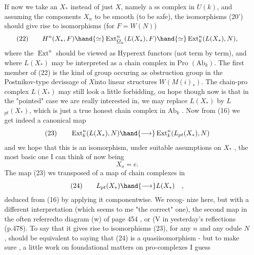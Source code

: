 If now we take an $X_*$ instead of just $X$, namely a ss complex in
$U(k)$, and assuming the components $X_n$ to be smooth (to be safe), the
isomorphisms (20') should give rise to isomorphisms (for $F=W(N)$)
\[ (22) \qquad H^n(X_*, F ) \hand{\simeq} \operatorname{Ext}^n_{\underline{O}_k}(L(X_*), F) \hand{\simeq} \operatorname{Ext}^n_k(L(X_*),N) , \]
where the $\operatorname{Ext}^n$ should be viewed as Hyperext functors (not term by
term), and where  $L(X_*)$ may be interpreted as a chain complex in
Pro $(\mathrm{Ab}_k)$. The first member of (22) is the kind of group occuring as
obstruction group in the Postnikov-type devissage of $X$\hand{$_*$}into linear
structures $W(M(i)_*)$. The chain-pro complex $L(X_*)$ may still look a
 little forbidding, ou hope though now is that in the "pointed" case
we are really interested in, we may replace $L(X_*)$ by $L$$_{pt}(X_*)$, which
is just a true honest chain complex in $\mathrm{Ab}_k$ . Now from (16) we get indeed
a canonical map
\[ (23) \qquad \operatorname{Ext}^n_k(L(X_*), N ) \hand{\longrightarrow} \operatorname{Ext}^n_k(L_{pt}(X_*), N ) \]
and we hope that this is an isomorphism, under suitable assumptions on
$X_*$ , the most basic one I can think of now being
\[ X_o = e . \]
The map (23) ws  transposed of a map of chain complexes in  
\[ (24) \qquad L_{pt}(X_*) \hand{\longrightarrow} L(X_*) \quad , \]
 deduced from (16) by applying it componentwise. We recog-%
nize here, but with a different interpretation (which seems to me
"the correct" one), the second map in the often referred\hand{-}to diagram (w)
of page 454 , or (V\hand{)} in yesterday's reflections (p.478). To say that
it gives rise to isomorphisms (23), for any $n$ and any odule $N$, should
be equivalent to saying that (24) is a quasiisomorphism - but to
make sure  ,    a little work on foundational
matters on pro-complexes I guess\hand{;} 


